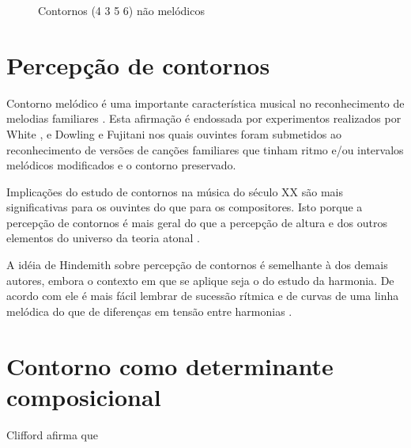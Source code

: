 \begin{figure}
  \centering

  \caption{Contornos (4 3 5 6) não melódicos}
  \label{fig:non-melodic-contours}
\end{figure}

\section{Percepção de contornos}
\label{sec:perc-de-cont}

Contorno melódico é uma importante característica musical no
reconhecimento de melodias familiares
\cite[p. 136]{dowling.ea86:music}. Esta afirmação é endossada por
experimentos realizados por White \cite{white60:recognition}, e
Dowling e Fujitani \cite{dowling.ea71:contour} nos quais ouvintes
foram submetidos ao reconhecimento de versões de canções familiares
que tinham ritmo e/ou intervalos melódicos modificados e o contorno
preservado.

Implicações do estudo de contornos na música do século XX são mais
significativas para os ouvintes do que para os compositores. Isto
porque a percepção de contornos é mais geral do que a percepção de
altura e dos outros elementos do universo da teoria atonal
\cite[p. 224]{friedmann85:methodology}.

A idéia de Hindemith sobre percepção de contornos é semelhante à dos
demais autores, embora o contexto em que se aplique seja o do estudo
da harmonia. De acordo com ele é mais fácil lembrar de sucessão
rítmica e de curvas de uma linha melódica do que de diferenças em
tensão entre harmonias \cite[p. 175]{hindemith41:craft}.

\section{Contorno como determinante composicional}
\label{sec:cont-como-determ}

Clifford afirma que


